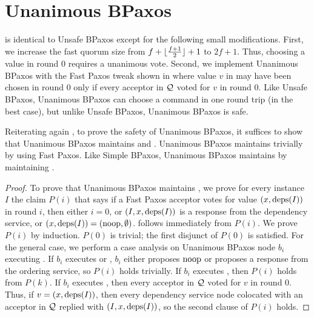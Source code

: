 \section{Unanimous BPaxos}
 is identical to Unsafe BPaxos except for the
following small modifications.  First, we increase the fast quorum size from
$f + \lfloor\frac{f + 1}{2}\rfloor + 1$ to $2f + 1$. Thus, choosing a value in round $0$ requires a
unanimous vote. Second, we implement Unanimous BPaxos with the Fast Paxos
tweak shown in  where value $v$ in
 may have been chosen in round $0$ only if every
acceptor in $\mathcal{Q}$ voted for $v$ in round $0$.
%
Like Unsafe BPaxos, Unanimous BPaxos can choose a command in one round trip (in
the best case), but unlike Unsafe BPaxos, Unanimous BPaxos is safe.

Reiterating again , to prove the safety of Unanimous
BPaxos, it suffices to show that Unanimous BPaxos maintains
 and . Unanimous BPaxos
maintains  trivially by using Fast Paxos. Like
Simple BPaxos, Unanimous BPaxos maintains  by
maintaining .

\begin{proof}
  To prove that Unanimous BPaxos maintains , we
  prove for every instance $I$ the claim $P(i)$ that says if a Fast Paxos
  acceptor votes for value $(x, \text{deps}(I))$ in round $i$, then either $i = 0$,
  or $(I, x, \text{deps}(I))$ is a response from the dependency service, or $(x,
  \text{deps}(I)) = (\text{noop}, \emptyset)$.
   follows immediately from $P(i)$. We prove
  $P(i)$ by induction. $P(0)$ is trivial; the first disjunct of $P(0)$ is
  satisfied. For the general case, we perform a case analysis on Unanimous
  BPaxos node $b_i$ executing .
  If $b_i$ executes  or
  , $b_i$ either proposes $\text{noop}$ or proposes
  a response from the ordering service, so $P(i)$ holds trivially.
  If $b_i$ executes , then $P(i)$ holds from
  $P(k)$.
  If $b_i$ executes , then every acceptor in
  $\mathcal{Q}$ voted for $v$ in round $0$. Thus, if $v = (x, \text{deps}(I))$, then
  every dependency service node colocated with an acceptor in $\mathcal{Q}$ replied
  with $(I, x, \text{deps}(I))$, so the second clause of $P(i)$ holds.
\end{proof}

